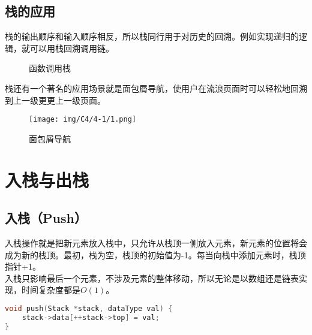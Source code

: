 \subsection{栈的应用}

栈的输出顺序和输入顺序相反，所以栈同行用于对历史的回溯。例如实现递归的逻辑，就可以用栈回溯调用链。\\

\begin{figure}[H]
	\centering
	\begin{drawstack}
		\startframe
		\startframe
		\cell{$ \vdots $}
		\startframe
	\end{drawstack}
	\caption{函数调用栈}
\end{figure}

栈还有一个著名的应用场景就是面包屑导航，使用户在流浪页面时可以轻松地回溯到上一级更更上一级页面。

\begin{figure}[H]
	\centering
	\texttt{[image: img/C4/4-1/1.png]}
	\caption{面包屑导航}
\end{figure}

\newpage

\section{入栈与出栈}

\subsection{入栈（Push）}

入栈操作就是把新元素放入栈中，只允许从栈顶一侧放入元素，新元素的位置将会成为新的栈顶。最初，栈为空，栈顶的初始值为-1。每当向栈中添加元素时，栈顶指针+1。\\

入栈只影响最后一个元素，不涉及元素的整体移动，所以无论是以数组还是链表实现，时间复杂度都是$ O(1) $。\\


\begin{lstlisting}[language=C]
void push(Stack *stack, dataType val) {
    stack->data[++stack->top] = val;
}
\end{lstlisting}

\vspace{0.5cm}

